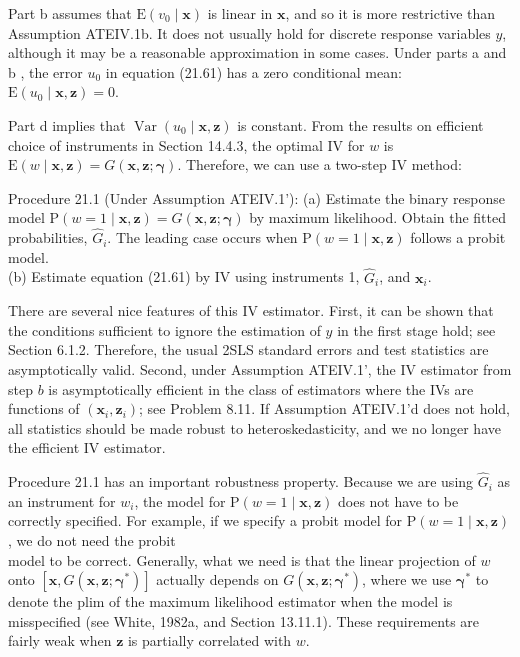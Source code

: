 \documentclass[10pt]{article}
\begin{document}
Part b assumes that $\mathrm{E}\left(v_{0} \mid \mathbf{x}\right)$ is linear in $\mathbf{x}$, and so it is more restrictive than Assumption ATEIV.1b. It does not usually hold for discrete response variables $y$, although it may be a reasonable approximation in some cases. Under parts a and b , the error $u_{0}$ in equation (21.61) has a zero conditional mean:\\
$\mathrm{E}\left(u_{0} \mid \mathbf{x}, \mathbf{z}\right)=0$.

Part d implies that $\operatorname{Var}\left(u_{0} \mid \mathbf{x}, \mathbf{z}\right)$ is constant. From the results on efficient choice of instruments in Section 14.4.3, the optimal IV for $w$ is $\mathrm{E}(w \mid \mathbf{x}, \mathbf{z})=G(\mathbf{x}, \mathbf{z} ; \boldsymbol{\gamma})$. Therefore, we can use a two-step IV method:

Procedure 21.1 (Under Assumption ATEIV.1'): (a) Estimate the binary response model $\mathrm{P}(w=1 \mid \mathbf{x}, \mathbf{z})=G(\mathbf{x}, \mathbf{z} ; \boldsymbol{\gamma})$ by maximum likelihood. Obtain the fitted probabilities, $\hat{G}_{i}$. The leading case occurs when $\mathrm{P}(w=1 \mid \mathbf{x}, \mathbf{z})$ follows a probit model.\\
(b) Estimate equation (21.61) by IV using instruments 1, $\hat{G}_{i}$, and $\mathbf{x}_{i}$.

There are several nice features of this IV estimator. First, it can be shown that the conditions sufficient to ignore the estimation of $y$ in the first stage hold; see Section 6.1.2. Therefore, the usual 2SLS standard errors and test statistics are asymptotically valid. Second, under Assumption ATEIV.1', the IV estimator from step $b$ is asymptotically efficient in the class of estimators where the IVs are functions of $\left(\mathbf{x}_{i}, \mathbf{z}_{i}\right)$; see Problem 8.11. If Assumption ATEIV.1'd does not hold, all statistics should be made robust to heteroskedasticity, and we no longer have the efficient IV estimator.

Procedure 21.1 has an important robustness property. Because we are using $\hat{G}_{i}$ as an instrument for $w_{i}$, the model for $\mathrm{P}(w=1 \mid \mathbf{x}, \mathbf{z})$ does not have to be correctly specified. For example, if we specify a probit model for $\mathrm{P}(w=1 \mid \mathbf{x}, \mathbf{z})$, we do not need the probit\\
model to be correct. Generally, what we need is that the linear projection of $w$ onto $\left[\mathbf{x}, G\left(\mathbf{x}, \mathbf{z} ; \boldsymbol{\gamma}^{*}\right)\right]$ actually depends on $G\left(\mathbf{x}, \mathbf{z} ; \boldsymbol{\gamma}^{*}\right)$, where we use $\boldsymbol{\gamma}^{*}$ to denote the plim of the maximum likelihood estimator when the model is misspecified (see White, 1982a, and Section 13.11.1). These requirements are fairly weak when $\mathbf{z}$ is partially correlated with $w$.
\end{document}
